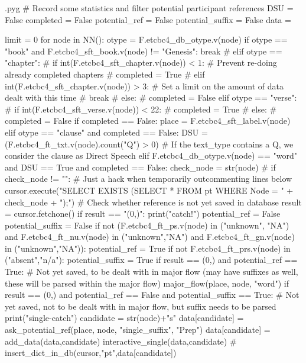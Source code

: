 \documentclass{report}
\makeatletter
\newenvironment{python}{%
  \VerbatimEnvironment
  \minted@resetoptions
  \setkeys{minted@opt}{}
      \begin{VerbatimOut}{\jobname.pyg}}
{%
      \end{VerbatimOut}
      \minted@pygmentize{python}
      \DeleteFile{\jobname.pyg}}
\makeatother
\begin{document}
\begin{python}
# Record some statistics and filter potential participant references
DSU = False
completed = False
potential_ref = False
potential_suffix = False
data = {}

limit = 0
for node in NN():
    otype = F.etcbc4_db_otype.v(node)
    if otype == "book" and F.etcbc4_sft_book.v(node) != "Genesis":
        break
#    elif otype == "chapter":
#        if int(F.etcbc4_sft_chapter.v(node)) < 1:    # Prevent re-doing already completed chapters
#            completed = True
#        elif int(F.etcbc4_sft_chapter.v(node)) > 3:    # Set a limit on the amount of data dealt with this time
#            break
#        else:
#            completed = False 
    elif otype == "verse":
#        if int(F.etcbc4_sft_verse.v(node)) < 22:
#           completed = True
#        else:
#           completed = False
        if completed == False:
            place = F.etcbc4_sft_label.v(node)
    elif otype == "clause" and completed == False:
        DSU = (F.etcbc4_ft_txt.v(node).count("Q") > 0)    # If the text_type contains a Q, we consider the clause as Direct Speech
    elif F.etcbc4_db_otype.v(node) == "word" and DSU == True and completed == False:
        check_node = str(node)
#        if check_node != "":     # Just a hack when temporarily outcommenting lines below
        cursor.execute("SELECT EXISTS (SELECT * FROM pt WHERE Node = " + check_node + ");") # Check whether reference is not yet saved in database
        result = cursor.fetchone()
        if result == "(0,)":
            print("catch!")
        potential_ref = False
        potential_suffix = False
        if not (F.etcbc4_ft_ps.v(node) in ("unknown", "NA") and F.etcbc4_ft_nu.v(node) in ("unknown","NA") and F.etcbc4_ft_gn.v(node) in ("unknown","NA")):
            potential_ref = True
        if not F.etcbc4_ft_prs.v(node) in ("absent","n/a"):
            potential_suffix = True
        if result == (0,) and potential_ref == True: # Not yet saved, to be dealt with in major flow (may have suffixes as well, these will be parsed within the major flow)
            major_flow(place, node, "word")
        if result == (0,) and potential_ref == False and potential_suffix == True: # Not yet saved, not to be dealt with in major flow, but suffix needs to be parsed
            print("single-catch")
            candidate = str(node)+"s"
            data[candidate] = ask_potential_ref(place, node, "single_suffix", "Prep")
            data[candidate] = add_data(data,candidate)
            interactive_single(data,candidate)
#            insert_dict_in_db(cursor,"pt",data[candidate])

\end{python}
\end{document}
